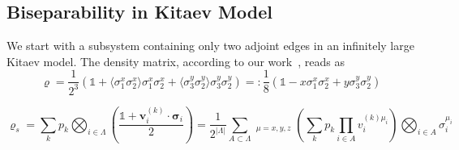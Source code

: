 \documentclass[12font]{article}
\theoremstyle{definition}
\newcommand{\anglelr}[1]{\langle #1 \rangle}
\newcommand{\lr}[1]{\left(  #1  \right)}
\newcommand{\lrg}[1]{\left\{  #1  \right\}}
\newcommand{\abs}[1]{\left|  #1  \right|}
\newcommand{\bo}[1]{\mathbf{#1}}
\newcommand{\bog}[1]{\boldsymbol{#1}}
\begin{document}
\subsection{Biseparability in Kitaev Model}
We start with a subsystem containing only two adjoint edges in an infinitely large Kitaev model. The density matrix, according to our work~\cite{wang2026exactorganizationdensitymatrices}, reads as
\begin{equation}
    \varrho = \frac{1}{2^{3}}\lr{\mathds{1}+\anglelr{\sigma^x_1\sigma^x_2}\sigma^x_1\sigma^x_2 + \anglelr{\sigma^y_3\sigma^y_2}\sigma^y_3\sigma^y_2} 
    =: 
    \frac{1}{8}\lr{\mathds{1} - x\sigma^x_1\sigma^x_2 + y\sigma^y_3\sigma^y_2}
\end{equation}

\[
\varrho_{s} = \sum_{k} p_k \bigotimes_{i\in\Lambda}\lr{\frac{\mathds{1} + \bo{v}_i^{(k)}\cdot\bog{\sigma}_i}{2}}
=
\frac{1}{2^{\abs{\Lambda}}}
\sum_{A\subset\Lambda} 
\mathop{\sum_{\lrg{\mu}}}_{\mu=x,y,z}
\lr{ 
    \sum_{k} p_k 
    \prod_{i\in A}v^{(k)\mu_i}_i
}
\bigotimes_{i\in A}\sigma_i^{\mu_i}
\]

\appendix
\end{document}
